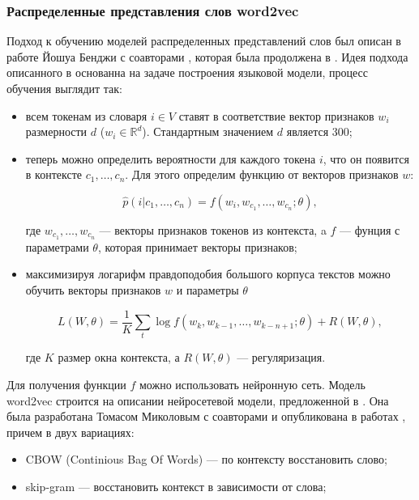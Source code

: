 \subsubsection{Распределенные представления слов word2vec}

Подход к обучению моделей распределенных представлений слов был описан в работе Йошуа Бенджи с соавторами
\cite{Bengio}, которая была продолжена в \cite{Zhou}. Идея подхода описанного в \cite{Bengio} основанна на
задаче построения языковой модели, процесс обучения выглядит так:

\bigskip
\begin{itemize}
 \item всем токенам из словаря $i \in V$ ставят в соответствие вектор признаков $w_i$ размерности $d$ ($w_i
\in \mathds{R}^d$). Стандартным значением $d$ является 300;

 \item теперь можно определить вероятности для каждого токена $i$, что он появится в контексте $c_1, \ldots,
c_n$. Для этого определим функцию от векторов признаков $w$:

 \begin{equation}
  \hat{p}(i|c_1, \ldots, c_n) = f(w_i, w_{c_1}, \ldots, w_{c_n}; \theta),
 \end{equation}

 где $w_{c_1}, \ldots, w_{c_n}$ --- векторы признаков токенов из контекста, a $f$ --- фунция с параметрами
$\theta$, которая принимает векторы признаков;

 \item максимизируя логарифм правдоподобия большого корпуса текстов можно обучить векторы признаков $w$ и
параметры $\theta$

 \begin{equation}
  L(W, \theta) = \frac{1}{K}\sum_t \log{f(w_k, w_{k-1}, \ldots, w_{k-n+1}; \theta) + R(W, \theta)},
 \end{equation}

 где $K$ размер окна контекста, а $R(W, \theta)$ --- регуляризация.

\end{itemize}

\bigskip
Для получения функции $f$ можно использовать нейронную сеть. Модель word2vec строится на описании
нейросетевой модели, предложенной в \cite{Bengio}. Она была разработана Томасом Миколовым с соавторами и
опубликована в работах \cite{Mikolov:1, Mikolov:2}, причем в двух вариациях:

\bigskip
\begin{itemize}
 \item CBOW (Continious Bag Of Words) --- по контексту восстановить слово;
 \item skip-gram --- восстановить контекст в зависимости от слова;
\end{itemize}

